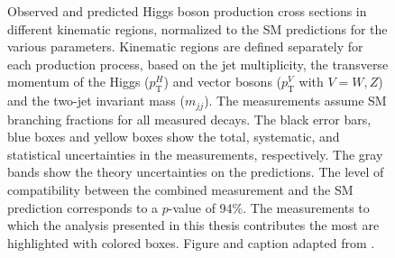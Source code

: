 \begin{figure}
    \caption[Observed and predicted Higgs boson production cross sections in different kinematic regions.]{
      Observed and predicted Higgs boson production cross sections in different
    kinematic regions, normalized to the SM predictions for the various parameters. 
    Kinematic regions are defined separately for each production process, based on the jet multiplicity, the transverse momentum of the Higgs ($p_{\textrm{T}}^H$) and vector bosons ($p_{\textrm{T}}^V$ with $V = W, Z$) and the two-jet invariant mass ($m_{jj}$).
    The measurements assume SM branching fractions for all measured decays. The black error bars, blue boxes and yellow boxes show the total, systematic, and statistical uncertainties in the measurements, respectively. The gray bands show the theory uncertainties on the predictions. The level of compatibility between the combined measurement and the SM prediction corresponds to a $p$-value of 94\%. 
    The measurements to which the \HWW analysis presented in this thesis contributes the most are highlighted with colored boxes. 
    Figure and caption adapted from .
    }
    \label{fig:stxs-stage12}
  \end{figure}

\FloatBarrier

